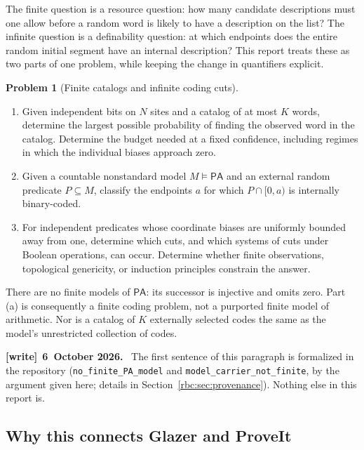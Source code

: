 \documentclass[11pt]{article}
\numberwithin{equation}{section}
\theoremstyle{definition}
\newtheorem{problem}[theorem]{Problem}
\theoremstyle{remark}
\newcommand{\PA}{\mathsf{PA}}
\newcommand{\file}[1]{\nolinkurl{#1}}
\newenvironment{writenote}[1][]{\par\smallskip\begingroup\small
 \noindent\textbf{[write]}\if\relax\detokenize{#1}\relax\else~\textbf{#1.}\fi\ }%
 {\par\endgroup\smallskip}
\begin{document}
The finite question is a resource question: how many candidate descriptions
must one allow before a random word is likely to have a description on the
list? The infinite question is a definability question: at which endpoints
does the entire random initial segment have an internal description? This
report treats these as two parts of one problem, while keeping the change in
quantifiers explicit.

\begin{problem}[Finite catalogs and infinite coding cuts]
\label{rbc:prob:main}
\begin{enumerate}[label=(\alph*)]
\item Given independent bits on $N$ sites and a catalog of at most $K$ words,
determine the largest possible probability of finding the observed word in
the catalog. Determine the budget needed at a fixed confidence, including
regimes in which the individual biases approach zero.
\item Given a countable nonstandard model $M\models\PA$ and an external
random predicate $P\subseteq M$, classify the endpoints $a$ for which
$P\cap[0,a)$ is internally binary-coded.
\item For independent predicates whose coordinate biases are uniformly
bounded away from one, determine which cuts, and which systems of cuts under
Boolean operations, can occur. Determine whether finite
observations, topological genericity, or induction principles constrain the
answer.
\end{enumerate}
\end{problem}

There are no finite models of $\PA$: its successor is injective and omits
zero. Part (a) is consequently a finite coding problem, not a purported
finite model of arithmetic. Nor is a catalog of $K$ externally selected
codes the same as the model's unrestricted collection of codes.

\begin{writenote}[6~October 2026]
The first sentence of this paragraph is formalized in the repository
(\file{no_finite_PA_model} and \file{model_carrier_not_finite}, by the
argument given here; details in Section~\ref{rbc:sec:provenance}). Nothing
else in this report is.
\end{writenote}

\subsection{Why this connects Glazer and ProveIt}
\end{document}
